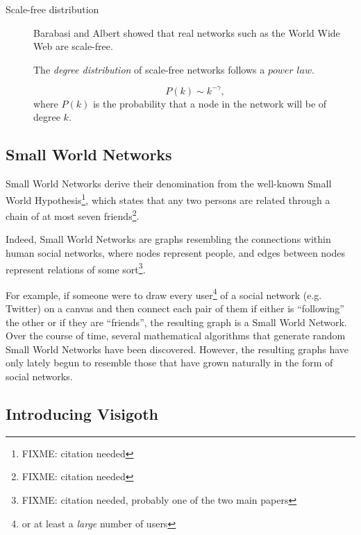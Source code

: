 \documentclass[a4paper,11pt,titlepage]{article}
\begin{document}
\begin{description}
\item [Scale-free distribution]

Barabasi and Albert showed that real networks such as the World Wide Web are 
scale-free.

The \emph{degree distribution} of scale-free networks follows a \(power\) \(law\).

\begin{equation}
\ P(k) \sim k^{-\gamma},
\end{equation}
where \(P(k)\) is the probability that a node in the network will be of degree \(k\).

\end{description}

\subsection{Small World Networks}

Small World Networks derive their denomination from the well-known
Small World Hypothesis\footnote{FIXME: citation needed}, which states
that any two persons are related through a chain of at most seven
friends\footnote{FIXME: citation needed}.

Indeed, Small World Networks are graphs resembling the connections
within human social networks, where nodes represent people, and edges
between nodes represent relations of some sort\footnote{FIXME:
  citation needed, probably one of the two main papers}.

For example, if someone were to draw every user\footnote{or at least a
  \emph{large} number of users} of a social network (e.g. Twitter) on
a canvas and then connect each pair of them if either is ``following''
the other or if they are ``friends'', the resulting graph is a Small
World Network. Over the course of time, several mathematical
algorithms that generate random Small World Networks have been
discovered. However, the resulting graphs have only lately begun to
resemble those that have grown naturally in the form of social
networks.



\subsection{Introducing Visigoth}
\end{document}
